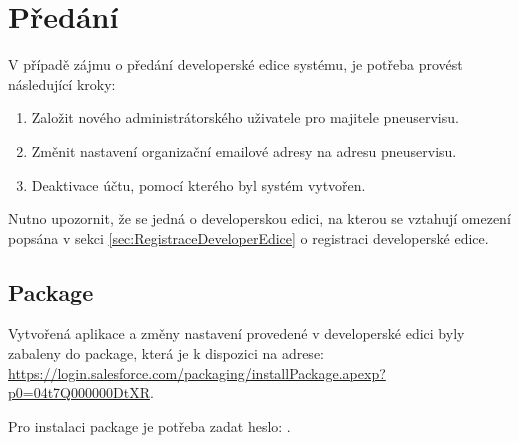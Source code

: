 \section{Předání} \label{sec:predani}
V případě zájmu o předání developerské edice systému, je potřeba provést následující kroky:
\begin{enumerate}
    \item Založit nového administrátorského uživatele pro majitele pneuservisu.
    \item Změnit nastavení organizační emailové adresy na adresu pneuservisu.
    \item Deaktivace účtu, pomocí kterého byl systém vytvořen.
\end{enumerate}
Nutno upozornit, že se jedná o developerskou edici, na kterou se vztahují omezení popsána v sekci \ref{sec:RegistraceDeveloperEdice} o registraci developerské edice.
\subsection{Package} \label{SalesforcePackage}
Vytvořená aplikace a změny nastavení provedené v developerské edici byly zabaleny do package, která je k dispozici na adrese:\\\url{https://login.salesforce.com/packaging/installPackage.apexp?p0=04t7Q000000DtXR}. 

Pro instalaci package je potřeba zadat heslo: .
